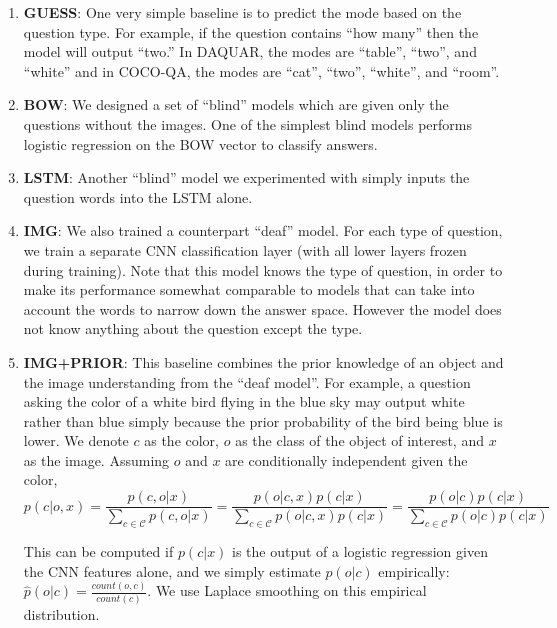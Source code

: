 \documentclass{article} \usepackage{nips15submit_e,times}
\renewcommand{\#}[1]{\textbf{#1}}
\begin{document}
\begin{enumerate}[leftmargin=*]
\item \#{GUESS}: One very simple baseline is to predict the mode based on the
question type. For example, if the question contains ``how many'' then the
model will output ``two.'' In DAQUAR, the modes are ``table'', ``two'', and
``white'' and in COCO-QA, the modes are ``cat'', ``two'', ``white'', and
``room''.

\item \#{BOW}: We designed a set of ``blind'' models which are given only the
questions without the images. One of the simplest blind models performs
logistic regression on the BOW vector to classify answers.

\item \#{LSTM}: Another ``blind'' model we experimented with simply inputs the
question words into the LSTM alone.

\item \#{IMG}: We also trained a counterpart ``deaf'' model. For each type of
question, we train a separate CNN classification layer (with all lower layers
frozen during training). Note that this model knows the type of question, in
order to make its performance somewhat comparable to models that can take
into account the words to narrow down the answer space. However the model does
not know anything about the question except the type.

\item \#{IMG+PRIOR}: This baseline combines the prior knowledge of an object
and the image understanding from the ``deaf model''. For example, a question
asking the color of a white bird flying in the blue sky may output white rather
than blue simply because the prior probability of the bird being blue is lower.
We denote $c$ as the color, $o$ as the class of the object of interest, and $x$
as the image. Assuming $o$ and $x$ are conditionally independent given the
color,
\begin{equation} 
p(c | o, x)
= \frac{p(c, o | x)}{\sum_{c \in \mathcal{C}} p(c, o | x)} 
= \frac{p(o | c, x) p(c | x)}{\sum_{c \in \mathcal{C}} p(o | c, x) p(c | x)}
= \frac{p(o | c) p(c | x)}{\sum_{c \in \mathcal{C}}p(o | c) p(c | x)}
\end{equation}

This can be computed if $p(c | x)$ is the output of a logistic regression given
the CNN features alone, and we simply estimate $p(o | c)$ empirically:
$\hat{p}(o | c) = \frac{count(o, c)}{count(c)}$. We use Laplace smoothing on
this empirical distribution.


\end{enumerate}
\end{document}
